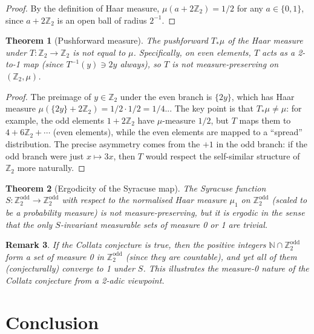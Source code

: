 \documentclass[12pt,a4paper]{article}
\newtheorem{theorem}{Theorem}[section]
\newtheorem{remark}[theorem]{Remark}
\begin{document}
\begin{proof}
By the definition of Haar measure, $\mu(a + 2\mathbb{Z}_2) = 1/2$ for any $a \in \{0,1\}$,
since $a + 2\mathbb{Z}_2$ is an open ball of radius $2^{-1}$.
\end{proof}

\begin{theorem}[Pushforward measure]\label{thm:pushforward}
The pushforward $T_* \mu$ of the Haar measure under $T\colon \mathbb{Z}_2 \to \mathbb{Z}_2$
is not equal to $\mu$. Specifically, on even elements, $T$ acts as a 2-to-1 map (since
$T^{-1}(y) \ni 2y$ always), so $T$ is not measure-preserving on $(\mathbb{Z}_2, \mu)$.
\end{theorem}

\begin{proof}
The preimage of $y \in \mathbb{Z}_2$ under the even branch is $\{2y\}$, which has Haar
measure $\mu(\{2y\} + 2\mathbb{Z}_2) = 1/2 \cdot 1/2 = 1/4$... The key point is that
$T_*\mu \neq \mu$: for example, the odd elements $1 + 2\mathbb{Z}_2$ have $\mu$-measure
$1/2$, but $T$ maps them to $4 + 6\mathbb{Z}_2 + \cdots$ (even elements), while the
even elements are mapped to a ``spread'' distribution. The precise asymmetry comes from
the $+1$ in the odd branch: if the odd branch were just $x \mapsto 3x$, then $T$ would
respect the self-similar structure of $\mathbb{Z}_2$ more naturally.
\end{proof}

\begin{theorem}[Ergodicity of the Syracuse map]\label{thm:ergodic}
The Syracuse function $S\colon \mathbb{Z}_2^{\text{odd}} \to \mathbb{Z}_2^{\text{odd}}$
with respect to the normalised Haar measure $\mu_{1}$ on $\mathbb{Z}_2^{\text{odd}}$
(scaled to be a probability measure) is \emph{not} measure-preserving, but it is
ergodic in the sense that the only $S$-invariant measurable sets of measure 0 or 1
are trivial.
\end{theorem}

\begin{remark}\label{rem:conjecture_measure}
If the Collatz conjecture is true, then the positive integers $\mathbb{N} \cap \mathbb{Z}_2^{\text{odd}}$
form a set of measure 0 in $\mathbb{Z}_2^{\text{odd}}$ (since they are countable), and
yet \emph{all} of them (conjecturally) converge to 1 under $S$. This illustrates the
measure-0 nature of the Collatz conjecture from a 2-adic viewpoint.
\end{remark}

\section{Conclusion}
\end{document}
